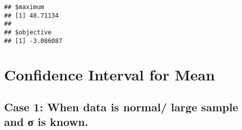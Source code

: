 \documentclass[
]{article}
\begin{document}
\begin{verbatim}
## $maximum
## [1] 48.71134
## 
## $objective
## [1] -3.086087
\end{verbatim}

\section{Confidence Interval for
Mean}\label{confidence-interval-for-mean}

\subsection{Case 1: When data is normal/ large sample and σ is
known.}\label{case-1-when-data-is-normal-large-sample-and-ux3c3-is-known.}
\end{document}
